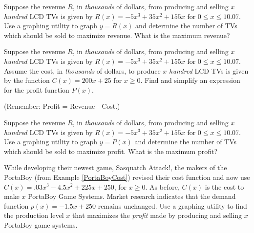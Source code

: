 \documentclass{ximera}
\begin{document}
\begin{problem}\label{lcdmaxprofitexerfirst}
Suppose the revenue $R$, in \textit{thousands} of dollars, from producing and selling $x$ \textit{hundred} LCD TVs is given by $R(x) = -5x^3+35x^2+155x$ for $0 \leq x \leq 10.07$.
Use a graphing utility to graph $y = R(x)$ and determine the number of TVs which should be sold to maximize revenue.  What is the maximum revenue?   
\end{problem}

\begin{problem}
Suppose the revenue $R$, in \textit{thousands} of dollars, from producing and selling $x$ \textit{hundred} LCD TVs is given by $R(x) = -5x^3+35x^2+155x$ for $0 \leq x \leq 10.07$.
Assume the cost, in \textit{thousands} of dollars, to produce $x$ \textit{hundred} LCD TVs is given by the function $C(x) = 200x + 25$ for $x \geq 0$. Find and simplify an expression for the profit function $P(x)$.  

(Remember: Profit = Revenue - Cost.)
\end{problem}

\begin{problem}\label{lcdmaxprofitexerlast}
Suppose the revenue $R$, in \textit{thousands} of dollars, from producing and selling $x$ \textit{hundred} LCD TVs is given by $R(x) = -5x^3+35x^2+155x$ for $0 \leq x \leq 10.07$.
Use a graphing utility to graph $y = P(x)$ and determine the number of TVs which should be sold to maximize profit.  What is the maximum  profit?
\end{problem}

\begin{problem}\label{newportaboycost}
While developing their newest game, Sasquatch Attack!, the makers of the PortaBoy (from Example \ref{PortaBoyCost}) revised their cost function and now use $C(x) = .03x^{3} - 4.5x^{2} + 225x + 250$, for $x \geq 0$. As before, $C(x)$ is the cost to make $x$ PortaBoy Game Systems.  Market research indicates that the demand function $p(x) = -1.5x + 250$ remains unchanged.  Use a graphing utility to find the production level $x$ that maximizes the \textit{profit} made by producing and selling $x$ PortaBoy game systems.
\end{problem}
\end{document}
